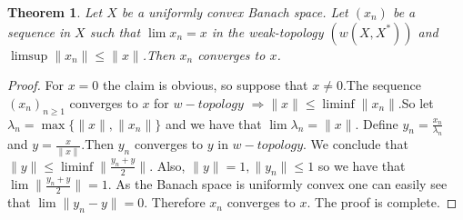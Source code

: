 \documentclass[12pt]{article}
\newtheorem{thm}{Theorem}
\begin{document}
\begin{thm} Let $X$ be a uniformly convex Banach space. Let  $(x_n)$ be a sequence in $X$ such that $\lim x_n= x$ in the weak-topology $(w(X,X^*))$ and $\limsup \|x_n\|\leq \|x\|$.Then $x_n$ converges to $x$.
\end{thm}

\begin{proof} For $x=0$ the claim is obvious, so suppose that $x\neq 0$.The  sequence $({x_n})_{n\geq 1}$ converges to $x$ for $w-topology$  $\Rightarrow \|x\|\leq \liminf\|x_n\|$.So let $\lambda_n=\max\{ \|x\|,\|x_n\|\}$ and we have that  $\lim\lambda_n= \|x\|$.
Define $y_n=\frac{x_n}{\lambda_n}$ and $y=\frac{x}{\|x\|}$.Then $y_n$ converges to $y$ in $w-topology$.
We conclude that $\|y\|\leq {\liminf{\|\frac{y_n+y}{2}\|}}$. Also, $\|y\|=1, \|y_n\|\leq 1$ so we have that $\lim\|\frac{y_n+y}{2}\|=1$. As the Banach space is uniformly convex one can easily see that 
$\lim\|y_n-y\|=0 $. Therefore $x_n$ converges to $x$. The proof is complete.
\end{proof}
\end{document}
